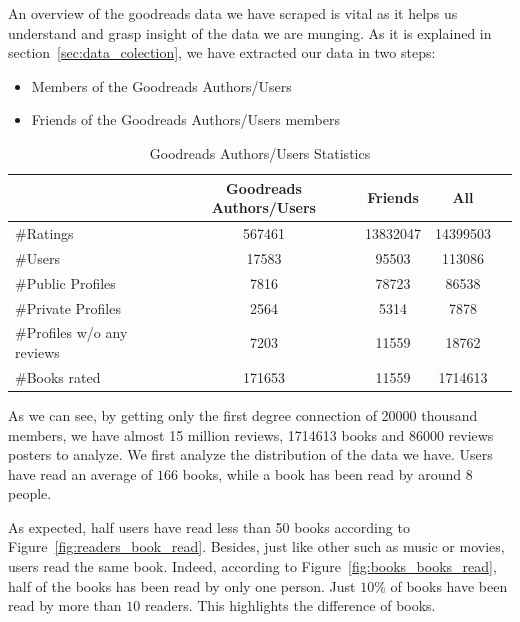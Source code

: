 \documentclass[11pt]{article}
\begin{document}
An overview of the goodreads data we have scraped is vital as it helps us understand and grasp insight of the data we are munging.
As it is explained in section~\ref{sec:data_colection}, we have extracted our data in two steps:
\begin{itemize}
\item Members of the Goodreads Authors/Users
\item Friends of the Goodreads Authors/Users members
\end{itemize}

\begin{table}[h]
\begin{center}
\begin{tabular}{lcccc}
\hline
                           &  Goodreads Authors/Users    &   Friends                &   All        \\ \hline
\#Ratings                  &  567461                     &   13832047               &   14399503  \\ \hline
\#Users                    &  17583                      &   95503                  &   113086     \\ \hline
\#Public Profiles          &  7816                       &   78723                  &   86538     \\ \hline
\#Private Profiles         &  2564                       &   5314                   &   7878      \\ \hline
\#Profiles w/o any reviews &  7203                       &   11559                  &   18762      \\ \hline
\#Books rated              &  171653                     &   11559                  &   1714613      \\ \hline
\end{tabular}
\end{center}
\caption{Goodreads Authors/Users Statistics} \label{table:crawl_stat}
\end{table}


As we can see, by getting only the first degree connection of 20000 thousand members, we have almost 15 million reviews, 1714613 books and 86000 reviews posters to analyze.
We first analyze the distribution of the data we have.
Users have read an average of $166$ books, while a book has been read by around $8$ people. 

As expected, half users have read less than 50 books according to Figure~\ref{fig:readers_book_read}. Besides, just like other such as music or movies, users read the same book. Indeed, according to Figure~\ref{fig:books_books_read}, half of the books has been read by only one person. Just $10$\% of books have been read by more than $10$ readers. This highlights the difference of books.
\end{document}
